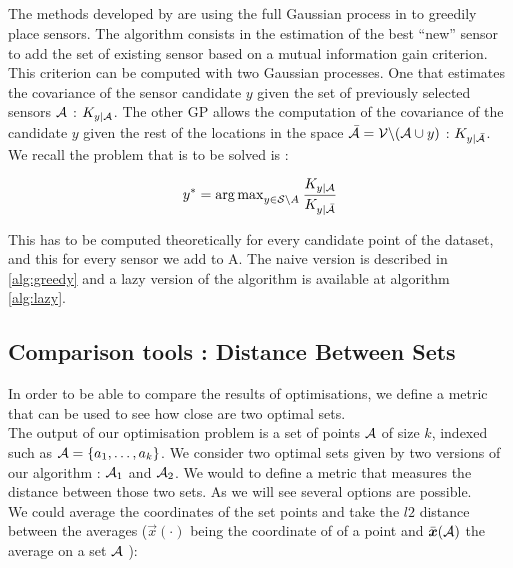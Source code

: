 
\subsection{}


The methods developed by \citet{krause_near-optimal_2008} are using the full Gaussian process in to greedily place sensors. The algorithm consists in the estimation of the best “new” sensor to add the set of existing sensor based on a mutual information gain criterion. This criterion can be computed with two Gaussian processes. One that estimates the covariance of the sensor candidate $y$ given the set of previously selected sensors $\mathcal{A}$ : $K_{y | \mathcal{A}}$. The other GP allows the computation of the covariance of the candidate $y$ given the rest of the locations in the space $\bar{\mathcal{A}} = \mathcal{V} \backslash ( \mathcal{A} \cup y )$ : $K_{y | \bar{\mathcal{A}}}$. We recall the problem that is to be solved is :

\begin{equation}
    y^* = {\arg \max}_{y \in \mathcal{S} \backslash A } \: \frac{K_{y | \mathcal{A}}}{K_{y | \bar{\mathcal{A}}}}
\end{equation}

This has to be computed theoretically for every candidate point of the dataset, and this for every sensor we add to A. The naive version is described in \ref{alg:greedy} and a lazy version of the algorithm is available at algorithm \ref{alg:lazy}.


\subsection{Comparison tools : Distance Between Sets}

In order to be able to compare the results of optimisations, we define a metric that can be used to see how close are two optimal sets. \\

The output of our optimisation problem is a set of points $\mathcal{A}$ of size $k$, indexed such as $\mathcal{A} = \{a_1, \dots, a_k\}$. We consider two optimal sets given by two versions of our algorithm : $\mathcal{A}_1$ and $\mathcal{A}_2$. We would to define a metric that measures the distance between those two sets. As we will see several options are possible. \\

We could average the coordinates of the set points and take the $l2$ distance between the averages ($\vec{x}(\cdot)$ being the coordinate of of a point and $\bar{{\boldsymbol{{x}}}}(\mathcal{A})$ the average on a set $\mathcal{A}$  ):

